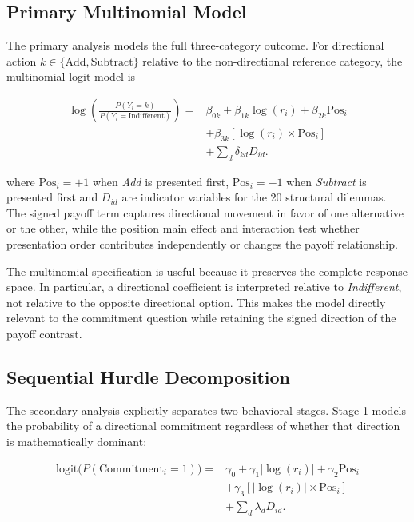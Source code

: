 \documentclass[10pt,journal,compsoc]{IEEEtran}
\begin{document}
\subsection{Primary Multinomial Model}
The primary analysis models the full three-category outcome. For directional action $k\in\{\text{Add},\text{Subtract}\}$ relative to the non-directional reference category, the multinomial logit model is

\begin{equation}
\begin{aligned}
\log\left(\frac{P(Y_i=k)}{P(Y_i=\text{Indifferent})}\right)
={}& \beta_{0k}+\beta_{1k}\log(r_i)+\beta_{2k}\text{Pos}_i \\
&+\beta_{3k}[\log(r_i)\times\text{Pos}_i] \\
&+\sum_{d} \delta_{kd}D_{id}.
\end{aligned}
\end{equation}

where $\text{Pos}_i=+1$ when \textit{Add} is presented first, $\text{Pos}_i=-1$ when \textit{Subtract} is presented first and $D_{id}$ are indicator variables for the 20 structural dilemmas. The signed payoff term captures directional movement in favor of one alternative or the other, while the position main effect and interaction test whether presentation order contributes independently or changes the payoff relationship.

The multinomial specification is useful because it preserves the complete response space. In particular, a directional coefficient is interpreted relative to \textit{Indifferent}, not relative to the opposite directional option. This makes the model directly relevant to the commitment question while retaining the signed direction of the payoff contrast.

\subsection{Sequential Hurdle Decomposition}
The secondary analysis explicitly separates two behavioral stages. Stage 1 models the probability of a directional commitment regardless of whether that direction is mathematically dominant:

\begin{equation}
\begin{aligned}
\text{logit}\big(P(\text{Commitment}_i=1)\big)
={}& \gamma_0+\gamma_1|\log(r_i)|+\gamma_2\text{Pos}_i \\
&+\gamma_3[|\log(r_i)|\times\text{Pos}_i] \\
&+\sum_{d}\lambda_d D_{id}.
\end{aligned}
\end{equation}
\end{document}
